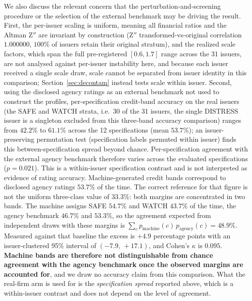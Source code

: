 \documentclass[a4paper,fleqn]{cas-sc}
\begin{document}
We also discuss the relevant concern that the perturbation-and-screening procedure or the selection of the external
benchmark may be driving the result. First, the per-issuer scaling is uniform, meaning all financial
ratios and the Altman Z$''$ are invariant by construction (Z$''$ transformed-vs-original correlation
$1.000000$, $100\%$ of issuers retain their original stratum), and the realized scale factors, which span
the full pre-registered $[0.6,1.7]$ range across the 31 issuers, are not analysed against per-issuer instability here, and because each issuer received a single scale draw, scale cannot be separated from issuer identity in this comparison; Section~\ref{sec:decontam} instead tests scale within issuer.  Second, using the disclosed agency ratings as an external benchmark not used to
construct the profiles, per-specification credit-band accuracy on the real issuers (the SAFE and WATCH
strata, i.e.\ 30 of the 31 issuers, the single DISTRESS issuer is a singleton excluded from this
three-band accuracy comparison) ranges from $42.2\%$
to $61.1\%$ across the 12 specifications (mean $53.7\%$); an issuer-preserving permutation test (specification
labels permuted within issuer) finds this between-specification spread beyond chance. Per-specification agreement with the external agency benchmark therefore varies across the evaluated specifications ($p=0.021$). This is a within-issuer specification contrast and is not
interpreted as evidence of rating accuracy. Machine-generated credit bands correspond to disclosed agency ratings
$53.7\%$ of the time. The correct reference for that figure is not the uniform three-class value of
$33.3\%$: both margins are concentrated in two bands. The machine assigns SAFE $54.7\%$ and WATCH
$43.7\%$ of the time, the agency benchmark $46.7\%$ and $53.3\%$, so the agreement expected from
independent draws with these margins is $\sum_c p_{\mathrm{machine}}(c)\,p_{\mathrm{agency}}(c)=48.9\%$.
Measured against that baseline the excess is $+4.9$ percentage points with an issuer-clustered
95\% interval of $(-7.9,\,+17.1)$, and Cohen's $\kappa$ is $0.095$. \textbf{Machine bands are
therefore not distinguishable from chance agreement with the agency benchmark once the observed
margins are accounted for}, and we draw no accuracy claim from this comparison. What the real-firm
arm is used for is the \emph{specification spread} reported above, which is a within-issuer
contrast and does not depend on the level of agreement.
\end{document}

